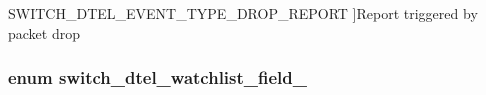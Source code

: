 \begin{Desc}
\begin{description}
{\hypertarget{group__DTel_ggad4cfb745b37be86549050bcd8c3166c0ad256ebc5cd56e6009f7751c011349e6a}{S\+W\+I\+T\+C\+H\+\_\+\+D\+T\+E\+L\+\_\+\+E\+V\+E\+N\+T\+\_\+\+T\+Y\+P\+E\+\_\+\+D\+R\+O\+P\+\_\+\+R\+E\+P\+O\+R\+T}\label{group__DTel_ggad4cfb745b37be86549050bcd8c3166c0ad256ebc5cd56e6009f7751c011349e6a}
}]Report triggered by packet drop \end{description}
\end{Desc}
\hypertarget{group__DTel_gac1ac564283da72d8f9315c73246d73a7}{
\subsubsection[{switch\+\_\+dtel\+\_\+watchlist\+\_\+field\+\_\+}]{\setlength{\rightskip}{0pt plus 5cm}enum {\bf switch\+\_\+dtel\+\_\+watchlist\+\_\+field\+\_\+}}}\label{group__DTel_gac1ac564283da72d8f9315c73246d73a7}
